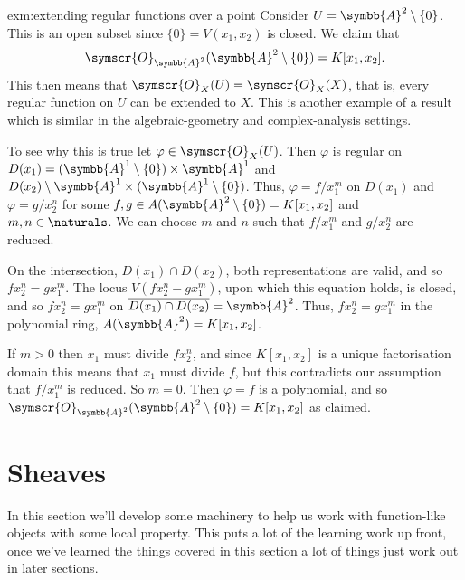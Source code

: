 \documentclass[fleqn]{NotesClass}
\newcommand{\affine}{\symbb{A}}
\newcommand{\sheaf}[1]{\symscr{#1}}
\begin{document}
    \begin{exm}{}{exm:extending regular functions over a point}
        Consider \(U = \affine^2 \setminus \{0\}\).
        This is an open subset since \(\{0\} = V(x_1, x_2)\) is closed.
        We claim that
        \begin{equation}
            \sheaf{O}_{\affine^2}(\affine^2 \setminus \{0\}) = K[x_1, x_2].
        \end{equation}
        This then means that \(\sheaf{O}_X(U) = \sheaf{O}_X(X)\), that is, every regular function on \(U\) can be extended to \(X\).
        This is another example of a result which is similar in the algebraic-geometry and complex-analysis settings.
        
        To see why this is true let \(\varphi \in \sheaf{O}_X(U)\).
        Then \(\varphi\) is regular on \(D(x_1) = (\affine^1 \setminus \{0\}) \times \affine^1\) and \(D(x_2) \setminus \affine^1 \times (\affine^1 \setminus \{0\})\).
        Thus, \(\varphi = f/x_1^m\) on \(D(x_1)\) and \(\varphi = g/x_2^n\) for some \(f, g \in A(\affine^2 \setminus \{0\}) = K[x_1, x_2]\) and \(m, n \in \naturals\).
        We can choose \(m\) and \(n\) such that \(f/x_1^m\) and \(g/x_2^n\) are reduced.
        
        On the intersection, \(D(x_1) \cap D(x_2)\), both representations are valid, and so \(fx_2^n = gx_1^m\).
        The locus \(V(fx_2^n - gx_1^m)\), upon which this equation holds, is closed, and so \(fx_2^n = gx_1^m\) on \(\overline{D(x_1) \cap D(x_2)} = \affine^2\).
        Thus, \(fx_2^n = gx_1^m\) in the polynomial ring, \(A(\affine^2) = K[x_1, x_2]\).
        
        If \(m > 0\) then \(x_1\) must divide \(fx_2^n\), and since \(K[x_1, x_2]\) is a unique factorisation domain this means that \(x_1\) must divide \(f\), but this contradicts our assumption that \(f/x_1^m\) is reduced.
        So \(m = 0\).
        Then \(\varphi = f\) is a polynomial, and so \(\sheaf{O}_{\affine^2}(\affine^2 \setminus \{0\}) = K[x_1, x_2]\) as claimed.
    \end{exm}
    
    \section{Sheaves}
    In this section we'll develop some machinery to help us work with function-like objects with some local property.
    This puts a lot of the learning work up front, once we've learned the things covered in this section a lot of things just work out in later sections.
    
\end{document}

